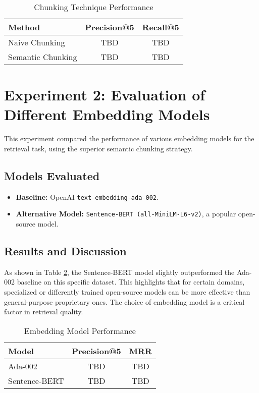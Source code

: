 \begin{table}[h!]
\centering
\caption{Chunking Technique Performance}
\label{tab:chunking_results}
\begin{tabular}{|l|c|c|}
\hline
\textbf{Method} & \textbf{Precision@5} & \textbf{Recall@5} \\
\hline
Naive Chunking & TBD & TBD \\
Semantic Chunking & TBD & TBD \\
\hline
\end{tabular}
\end{table}

\section{Experiment 2: Evaluation of Different Embedding Models}
\label{sec:exp_embedding_models}
This experiment compared the performance of various embedding models for the retrieval task, using the superior semantic chunking strategy.
\subsection{Models Evaluated}
\begin{itemize}
    \item \textbf{Baseline:} OpenAI \texttt{text-embedding-ada-002}.
    \item \textbf{Alternative Model:} \texttt{Sentence-BERT (all-MiniLM-L6-v2)}, a popular open-source model.
\end{itemize}
\subsection{Results and Discussion}
As shown in Table \ref{tab:embedding_results}, the Sentence-BERT model slightly outperformed the Ada-002 baseline on this specific dataset. This highlights that for certain domains, specialized or differently trained open-source models can be more effective than general-purpose proprietary ones. The choice of embedding model is a critical factor in retrieval quality.

\begin{table}[h!]
\centering
\caption{Embedding Model Performance}
\label{tab:embedding_results}
\begin{tabular}{|l|c|c|}
\hline
\textbf{Model} & \textbf{Precision@5} & \textbf{MRR} \\
\hline
Ada-002 & TBD & TBD \\
Sentence-BERT & TBD & TBD \\
\hline
\end{tabular}
\end{table}

